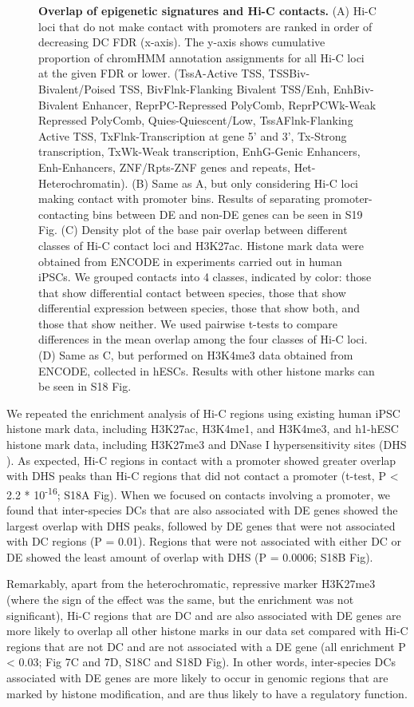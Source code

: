 \begin{figure}
\caption[Overlap of epigenetic signatures and Hi-C contacts.]{\textbf{Overlap of epigenetic signatures and Hi-C contacts.} (A) Hi-C loci that do not make contact with promoters are ranked in order of decreasing DC FDR (x-axis). The y-axis shows cumulative proportion of chromHMM annotation assignments for all Hi-C loci at the given FDR or lower. (TssA-Active TSS, TSSBiv-Bivalent/Poised TSS, BivFlnk-Flanking Bivalent TSS/Enh, EnhBiv-Bivalent Enhancer, ReprPC-Repressed PolyComb, ReprPCWk-Weak Repressed PolyComb, Quies-Quiescent/Low, TssAFlnk-Flanking Active TSS, TxFlnk-Transcription at gene 5' and 3', Tx-Strong transcription, TxWk-Weak transcription, EnhG-Genic Enhancers, Enh-Enhancers, ZNF/Rpts-ZNF genes and repeats, Het-Heterochromatin). (B) Same as A, but only considering Hi-C loci making contact with promoter bins. Results of separating promoter-contacting bins between DE and non-DE genes can be seen in S19 Fig. (C) Density plot of the base pair overlap between different classes of Hi-C contact loci and H3K27ac. Histone mark data were obtained from ENCODE in experiments carried out in human iPSCs. We grouped contacts into 4 classes, indicated by color: those that show differential contact between species, those that show differential expression between species, those that show both, and those that show neither. We used pairwise t-tests to compare differences in the mean overlap among the four classes of Hi-C loci. (D) Same as C, but performed on H3K4me3 data obtained from ENCODE, collected in hESCs. Results with other histone marks can be seen in S18 Fig.}
\label{fig:ch02-fig7}
\end{figure}

We repeated the enrichment analysis of Hi-C regions using existing human iPSC histone mark data, including H3K27ac, H3K4me1, and H3K4me3, and h1-hESC histone mark data, including H3K27me3 and DNase I hypersensitivity sites (DHS \cite{consortium.2012a}). As expected, Hi-C regions in contact with a promoter showed greater overlap with DHS peaks than Hi-C regions that did not contact a promoter (t-test, P {\textless} 2.2 * 10\textsuperscript{-16}; S18A Fig). When we focused on contacts involving a promoter, we found that inter-species DCs that are also associated with DE genes showed the largest overlap with DHS peaks, followed by DE genes that were not associated with DC regions (P = 0.01). Regions that were not associated with either DC or DE showed the least amount of overlap with DHS (P = 0.0006; S18B Fig).

Remarkably, apart from the heterochromatic, repressive marker H3K27me3 (where the sign of the effect was the same, but the enrichment was not significant), Hi-C regions that are DC and are also associated with DE genes are more likely to overlap all other histone marks in our data set compared with Hi-C regions that are not DC and are not associated with a DE gene (all enrichment P {\textless} 0.03; Fig 7C and 7D, S18C and S18D Fig). In other words, inter-species DCs associated with DE genes are more likely to occur in genomic regions that are marked by histone modification, and are thus likely to have a regulatory function.

